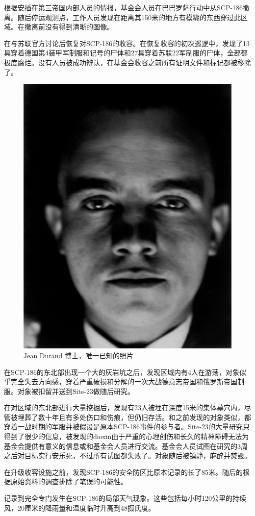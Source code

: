 根据安插在第三帝国内部人员的情报，基金会人员在巴巴罗萨行动中从SCP-186撤离。随后停运观测点，工作人员发现在距离其150米的地方有模糊的东西穿过此区域。在撤离前没有得到清晰的图像。

在与苏联官方讨论后恢复对SCP-186的收容。在恢复收容的初次巡逻中，发现了13具穿着德国第4装甲军制服和记号的尸体和27具穿着苏联22军制服的尸体，全部都极度腐烂。没有人员被成功辨认，在基金会收容之前所有证明文件和标记都被移除了。

\begin{figure}[H]
    \centering
    \includegraphics[width=0.5\linewidth]{images/SCP-186-3.jpg}
    \caption*{Jean Durand 博士，唯一已知的照片}
\end{figure}

在SCP-186的东北部出现一个大的灰岩坑之后，发现区域内有4人在游荡，对象似乎完全失去方向感，穿着严重破损和分解的一次大战德意志帝国和俄罗斯帝国制服。对象被扣留并送到Site-23做随后研究。

在对区域的东北部进行大量挖掘后，发现有23人被埋在深度15米的集体墓穴内，尽管被埋葬了数十年且有多处伤口和伤痕，但仍旧存活。和之前发现的对象类似，都穿着一战时期的军服并被假设是原本SCP-186事件的参与者。Site-23的大量研究只得到了很少的信息，被发现的dioxin由于严重的心理创伤和长久的精神障碍无法为基金会提供有意义的信息或和基金会人员进行交流。基金会人员试图在研究的3周之后对目标实行安乐死，不过所有试图都失败了。对象随后被镇静，麻醉并焚毁。

在升级收容设施之前，发现SCP-186的安全防区比原本记录的长了85米。随后的根据原始资料的调查排除了笔误的可能性。

记录到完全专门发生在SCP-186的局部天气现象。这些包括每小时120公里的持续风，20厘米的降雨量和温度临时升高到48摄氏度。

